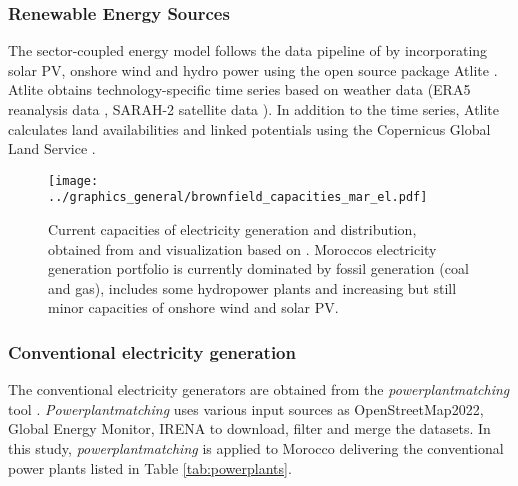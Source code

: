 \subsubsection{Renewable Energy Sources}
The sector-coupled energy model follows the data pipeline of \cite{Parzen2023} by incorporating solar PV, onshore wind and hydro power using the open source package Atlite \cite{Hofmann2021}. %
Atlite obtains technology-specific time series based on weather data (ERA5 reanalysis data \cite{Hersbach2020}, SARAH-2 satellite data \cite{Pfeifroth2017}). %
In addition to the time series, Atlite calculates land availabilities and linked potentials using the Copernicus Global Land Service \cite{Buchhorn2020}.





\begin{figure*}[t]
    \centering
    \texttt{[image: ../graphics\_general/brownfield\_capacities\_mar\_el.pdf]}
    \caption{Current capacities of electricity generation and distribution, obtained from \cite{Parzen2022} and visualization based on \cite{Horsch2018}. Moroccos electricity generation portfolio is currently dominated by fossil generation (coal and gas), includes some hydropower plants and increasing but still minor capacities of onshore wind and solar PV.}
    \label{fig:MAR_brownfield}
\end{figure*}


\subsubsection{Conventional electricity generation}
The conventional electricity generators are obtained from the \textit{powerplantmatching} tool \cite{Powerplantmatching2019}. \textit{Powerplantmatching} uses various input sources as OpenStreetMap2022, Global Energy Monitor, IRENA \cite{IRENA2022, OpenStreetMap2022, GlobalEnergyMonitor} to download, filter and merge the datasets. 
In this study, \textit{powerplantmatching} is applied to Morocco delivering the conventional power plants listed in Table \ref{tab:powerplants}. 


